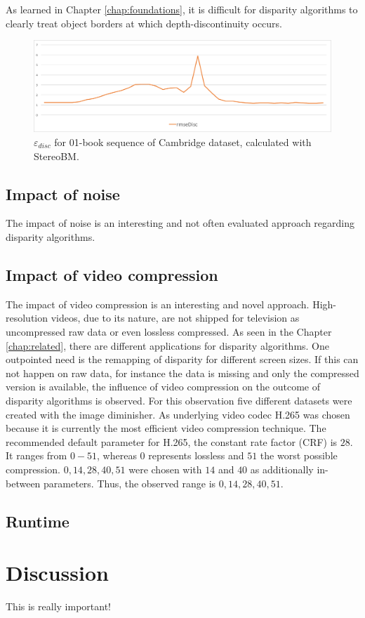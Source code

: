 \noindent As learned in Chapter \ref{chap:foundations}, it is difficult for disparity algorithms to clearly treat object borders at which depth-discontinuity occurs.

\begin{figure}[h!]
  \centering
  \includegraphics[width=1.0\textwidth]{src/images/evaluation/outliers/plot1.pdf}
  \caption{$\varepsilon_{disc}$ for 01-book sequence of Cambridge dataset, calculated with StereoBM.}
  \label{fig:plot1}
\end{figure}

\subsection{Impact of noise}

The impact of noise is an interesting and not often evaluated approach regarding disparity algorithms.

\subsection{Impact of video compression}

The impact of video compression is an interesting and novel approach.
High-resolution videos, due to its nature, are not shipped for television as uncompressed raw data or even lossless compressed.
As seen in the Chapter \ref{chap:related}, there are different applications for disparity algorithms.
One outpointed need is the remapping of disparity for different screen sizes.
If this can not happen on raw data, for instance the data is missing and only the compressed version is available, the influence of video compression on the outcome of disparity algorithms is observed.
\newline\newline\noindent For this observation five different datasets were created with the image diminisher.
As underlying video codec H.265 was chosen because it is currently the most efficient video compression technique.
The recommended default parameter for H.265, the constant rate factor (CRF) is $28$.
It ranges from $0-51$, whereas $0$ represents lossless and $51$ the worst possible compression.
$0, 14, 28, 40, 51$ were chosen with $14$ and $40$ as additionally in-between parameters.
Thus, the observed range is $0, 14, 28, 40, 51$.

\subsection{Runtime}


\newpage
\section{Discussion}

This is really important!


